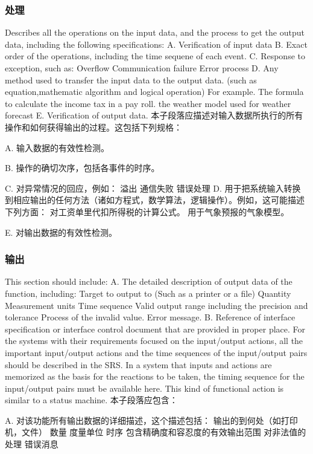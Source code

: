 \subsubsection{处理}
Describes all the operations on the input data, and the process to get the output data, including the following specifications:
A. Verification of input data
B. Exact order of the operations, including the time sequene of each event.
C. Response to exception, such as:
		 Overflow
		Communication failure
		Error process
D. Any method used to transfer the input data to the output data. (such as equation,mathematic algorithm and logical operation)
For example.
		The formula to calculate the income tax in a pay roll.
		the weather model used for weather forecast
E. Verification of output data.
本子段落应描述对输入数据所执行的所有操作和如何获得输出的过程。这包括下列规格：

A. 输入数据的有效性检测。

B. 操作的确切次序，包括各事件的时序。

C. 对异常情况的回应，例如：
		溢出
		通信失败
		错误处理
D. 用于把系统输入转换到相应输出的任何方法（诸如方程式，数学算法，逻辑操作）。例如，这可能描述下列方面：
		对工资单里代扣所得税的计算公式。
		用于气象预报的气象模型。
		
E.	对输出数据的有效性检测。
\subsubsection{输出}
This section should include:
A. The detailed description of output data of the function, including:
		Target to output to (Such as a printer or a file)
		Quantity
		Measurement units
		Time sequence
		Valid output range including the precision and tolerance
		Process of the invalid value.
		Error message.
B. Reference of interface specification or interface control document that are provided in proper place.
For the systems with their requirements focused on the input/output actions, all the important input/output actions and the time sequences of the input/output pairs should be described in the SRS. In a system that inputs and actions are memorized as the basis for the reactions to be taken, the timing sequence for the input/output pairs must be available here. This kind of functional action is similar to a status machine.  
本子段落应包含：

A. 对该功能所有输出数据的详细描述，这个描述包括：
		输出的到何处（如打印机，文件）
		数量
		度量单位
		时序
		包含精确度和容忍度的有效输出范围
		对非法值的处理
		错误消息
		
